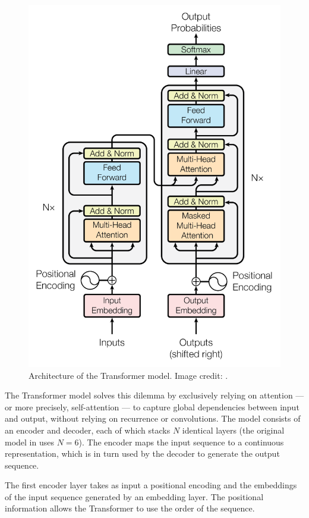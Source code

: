 \documentclass[11pt,a4paper]{article}
\begin{document}
\begin{figure}[ht]
    \centering
    \includegraphics[scale=0.5]{images/Transformer.PNG}
    \caption{Architecture of the Transformer model. Image credit: \cite{transformer}.}
    \label{fig:transformer}
\end{figure}

The Transformer model solves this dilemma by exclusively relying on attention --- or more precisely, self-attention --- to capture global dependencies between input and output, without relying on recurrence or convolutions.
The model consists of an encoder and decoder, each of which stacks $N$ identical layers  (the original model in \citet{transformer} uses $N=6$). The encoder maps the input sequence to a continuous representation, which is in turn used by the decoder to generate the output sequence.

The first encoder layer takes as input a positional encoding and the embeddings of the input sequence generated by an embedding layer. The positional information allows the Transformer to use the order of the sequence.
\end{document}
